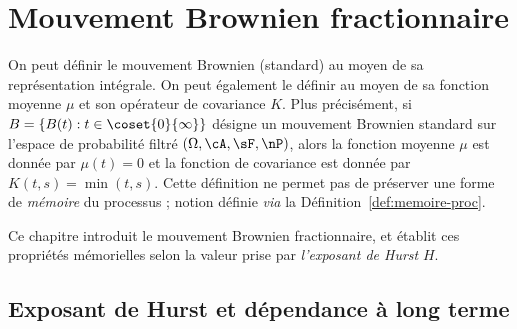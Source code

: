 
\chapter{Mouvement Brownien fractionnaire}

On peut définir le mouvement Brownien (standard) au moyen de sa
représentation intégrale. On peut également le définir au moyen de sa
fonction moyenne $\mu$ et son opérateur de covariance $K$. Plus
précisément, si $B = \{B(t) : t \in \coset{0}{\infty}\}$ désigne un
mouvement Brownien standard sur l'espace de probabilité filtré
$\left(\Omega, \cA, \sF, \nP\right)$, alors la fonction moyenne $\mu$
est donnée par $\mu(t) = 0$ et la fonction de covariance est donnée
par $K(t,s) = \min(t,s)$. Cette définition ne permet pas de préserver
une forme de \emph{\og mémoire \fg{}} du processus ; notion définie
\emph{via} la Définition~\ref{def:memoire-proc}.

Ce chapitre introduit le mouvement Brownien fractionnaire, et établit
ces propriétés mémorielles selon la valeur prise par \emph{l'exposant
de Hurst} $H$. 

\section{Exposant de Hurst et dépendance à long terme}

